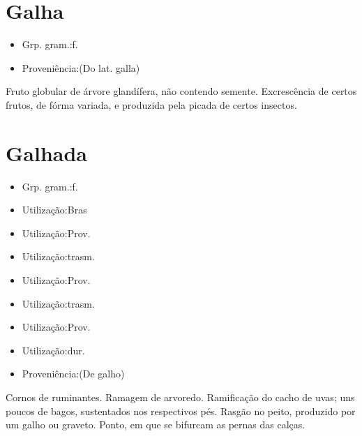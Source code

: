 \section{Galha}
\begin{itemize}
\item {Grp. gram.:f.}
\end{itemize}
\begin{itemize}
\item {Proveniência:(Do lat. \textunderscore galla\textunderscore )}
\end{itemize}
Fruto globular de árvore glandífera, não contendo semente.
Excrescência de certos frutos, de fórma variada, e produzida pela picada de certos insectos.
\section{Galhada}
\begin{itemize}
\item {Grp. gram.:f.}
\end{itemize}
\begin{itemize}
\item {Utilização:Bras}
\end{itemize}
\begin{itemize}
\item {Utilização:Prov.}
\end{itemize}
\begin{itemize}
\item {Utilização:trasm.}
\end{itemize}
\begin{itemize}
\item {Utilização:Prov.}
\end{itemize}
\begin{itemize}
\item {Utilização:trasm.}
\end{itemize}
\begin{itemize}
\item {Utilização:Prov.}
\end{itemize}
\begin{itemize}
\item {Utilização:dur.}
\end{itemize}
\begin{itemize}
\item {Proveniência:(De \textunderscore galho\textunderscore )}
\end{itemize}
Cornos de ruminantes.
Ramagem de arvoredo.
Ramificação do cacho de uvas; uns poucos de bagos, sustentados nos respectivos pés.
Rasgão no peito, produzido por um galho ou graveto.
Ponto, em que se bifurcam as pernas das calças.
